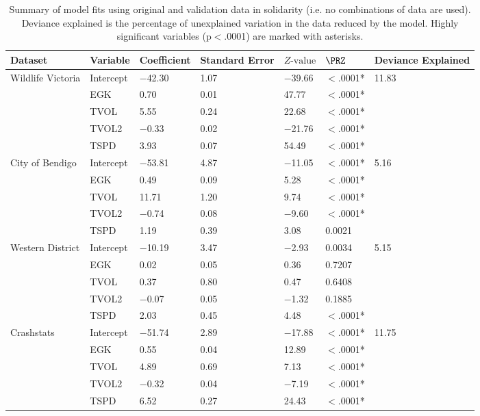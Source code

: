 \begin{table}[!h]
\caption[Summary of model fits using original and validation data]{Summary of model fits using original and validation data in solidarity (i.e. no combinations of data are used). Deviance explained is the percentage of unexplained variation in the data reduced by the model. Highly significant variables (p$<$.0001) are marked with asterisks.}
\centering
\begin{tabularx}{0.9\textwidth}{lllYllY} \toprule
Dataset & Variable & Coefficient & Standard Error & $Z\text{-value}$ & $\PRZ$ & Deviance Explained \\ 
  \midrule
Wildlife Victoria & Intercept & $-$42.30 & 1.07 & $-$39.66 & $<$.0001* & 11.83 \\ 
   & EGK & 0.70 & 0.01 & 47.77 & $<$.0001* &  \\ 
   & TVOL & 5.55 & 0.24 & 22.68 & $<$.0001* &  \\ 
   & TVOL2 & $-$0.33 & 0.02 & $-$21.76 & $<$.0001* &  \\ 
   & TSPD & 3.93 & 0.07 & 54.49 & $<$.0001* &  \\ 
  City of Bendigo & Intercept & $-$53.81 & 4.87 & $-$11.05 & $<$.0001* & 5.16 \\ 
   & EGK & 0.49 & 0.09 & 5.28 & $<$.0001* &  \\ 
   & TVOL & 11.71 & 1.20 & 9.74 & $<$.0001* &  \\ 
   & TVOL2 & $-$0.74 & 0.08 & $-$9.60 & $<$.0001* &  \\ 
   & TSPD & 1.19 & 0.39 & 3.08 & 0.0021 &  \\ 
  Western District & Intercept & $-$10.19 & 3.47 & $-$2.93 & 0.0034 & 5.15 \\ 
   & EGK & 0.02 & 0.05 & 0.36 & 0.7207 &  \\ 
   & TVOL & 0.37 & 0.80 & 0.47 & 0.6408 &  \\ 
   & TVOL2 & $-$0.07 & 0.05 & $-$1.32 & 0.1885 &  \\ 
   & TSPD & 2.03 & 0.45 & 4.48 & $<$.0001* &  \\ 
  Crashstats & Intercept & $-$51.74 & 2.89 & $-$17.88 & $<$.0001* & 11.75 \\ 
   & EGK & 0.55 & 0.04 & 12.89 & $<$.0001* &  \\ 
   & TVOL & 4.89 & 0.69 & 7.13 & $<$.0001* &  \\ 
   & TVOL2 & $-$0.32 & 0.04 & $-$7.19 & $<$.0001* &  \\ 
   & TSPD & 6.52 & 0.27 & 24.43 & $<$.0001* &  \\ 
\bottomrule
\end{tabularx}
\label{val_glm_perf}
\end{table}

